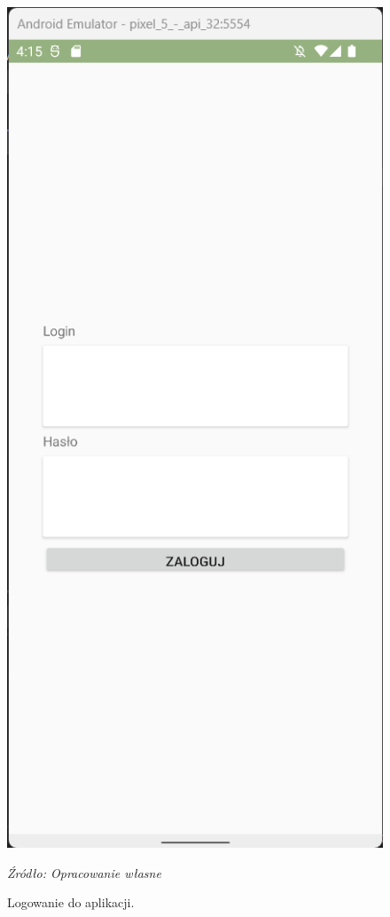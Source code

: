 \documentclass[12pt,twoside]{report}
\begin{document}
\begin{figure}
	\centering
	\includegraphics[scale=0.35]{LoginView}
	\caption{\centering Logowanie do aplikacji.}
	\textit{\centering Źródło: Opracowanie własne}
	\label{LoginView}
	\newline
	\newline

\end{figure}
\end{document}
